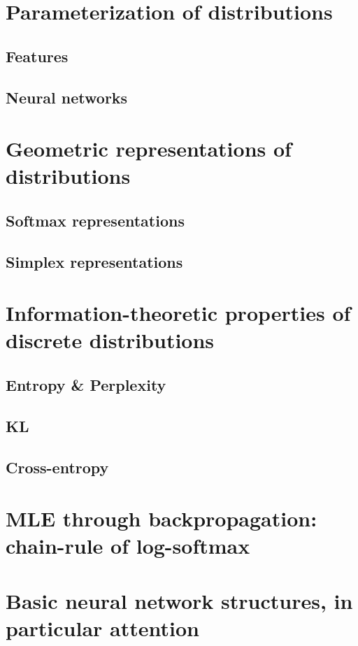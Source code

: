 \documentclass[11pt]{article}
\begin{document}
\section{Parameterization of distributions}

\subsection{Features}
\subsection{Neural networks}

\section{Geometric representations of distributions}

\subsection{Softmax representations}

\subsection{Simplex representations}

\section{Information-theoretic properties of discrete distributions}

\subsection{Entropy \& Perplexity}
\subsection{KL}
\subsection{Cross-entropy}

\section{MLE through backpropagation: chain-rule of log-softmax}

\section{Basic neural network structures, in particular attention}
\end{document}
